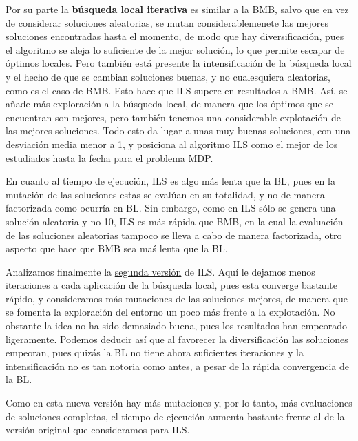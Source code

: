 \documentclass[11pt,a4paper]{article}
\begin{document}
	Por su parte la \textbf{búsqueda local iterativa} es similar a la BMB, salvo que en vez de considerar soluciones aleatorias, se mutan considerablemenete las mejores soluciones encontradas hasta el momento, de modo que hay diversificación, pues el algoritmo se aleja lo suficiente de la mejor solución, lo que permite escapar de óptimos locales. Pero también está presente la intensificación de la búsqueda local y el hecho de que se cambian soluciones buenas, y no cualesquiera aleatorias, como es el caso de BMB. Esto hace que ILS supere en resultados a BMB. Así, se añade más exploración a la búsqueda local, de manera que los óptimos que se encuentran son mejores, pero también tenemos una considerable explotación de las mejores soluciones. Todo esto da lugar a unas muy buenas soluciones, con una desviación media menor a 1, y posiciona al algoritmo ILS como el mejor de los estudiados hasta la fecha para el problema MDP. 
	
	En cuanto al tiempo de ejecución, ILS es algo más lenta que la BL, pues en la mutación de las soluciones estas se evalúan en su totalidad, y no de manera factorizada como ocurría en BL. Sin embargo, como en ILS sólo se genera una solución aleatoria y no 10, ILS es más rápida que BMB, en la cual la evaluación de las soluciones aleatorias tampoco se lleva a cabo de manera factorizada, otro aspecto que hace que BMB sea maś lenta que la BL. 
	
	Analizamos finalmente la \underline{segunda versión} de ILS. Aquí le dejamos menos iteraciones a cada aplicación de la búsqueda local, pues esta converge bastante rápido, y consideramos más mutaciones de las soluciones mejores, de manera que se fomenta la exploración del entorno un poco más frente a la explotación. No obstante la idea no ha sido demasiado buena, pues los resultados han empeorado ligeramente. Podemos deducir así que al favorecer la diversificación las soluciones empeoran, pues quizás la BL no tiene ahora suficientes iteraciones y la intensificación no es tan notoria como antes, a pesar de la rápida convergencia de la BL. 
	
	Como en esta nueva versión hay más mutaciones y, por lo tanto, más evaluaciones de soluciones completas, el tiempo de ejecución aumenta bastante frente al de la versión original que consideramos para ILS. 
	
\end{document}
